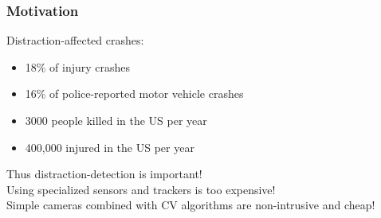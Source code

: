 \documentclass{beamer}
\begin{document}
	\begin{frame}
		\frametitle{Motivation}
		Distraction-affected crashes:
		\begin{itemize}
			\item 18\% of injury crashes \cite{knuthwebsite}
			\item 16\% of police-reported motor vehicle crashes
			\item 3000 people killed in the US per year
			\item 400,000 injured in the US per year
		\end{itemize}
		\vspace{0.2cm}
		Thus distraction-detection is important! \\		\vspace{0.2cm}
		Using specialized sensors and trackers is too expensive! \\
		\vspace{0.2cm}
		Simple cameras combined with CV algorithms are non-intrusive and cheap!
	
\end{frame}
	
\end{document}
